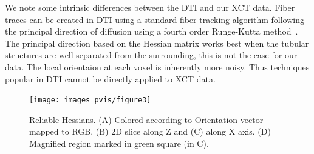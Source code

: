  
We note some intrinsic differences between the DTI and our XCT data. Fiber traces can be created in DTI using a standard fiber tracking algorithm following the principal direction of diffusion using a fourth order Runge-Kutta method~\cite{Brun2003}. The principal direction based on the Hessian matrix works best when the tubular structures are well separated from the surrounding, this is not the case for our data. The local orientaion at each voxel is inherently more noisy. Thus techniques popular in DTI cannot be directly applied to XCT data.

%
\begin{figure}[tb]
\centering
\texttt{[image: images\_pvis/figure3]}
\caption{Reliable Hessians. (A) Colored according to Orientation vector mapped to RGB. (B) 2D slice along Z and (C) along X axis. (D) Magnified region marked in green square (in C).}
\label{fig:reliable_hessian}
\end{figure}


